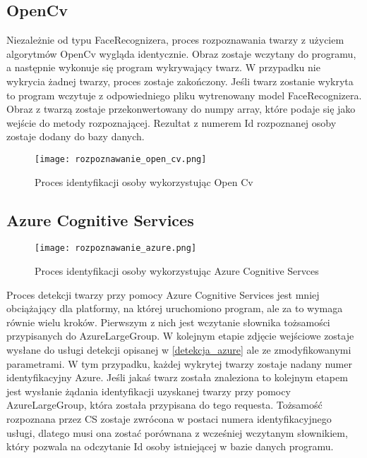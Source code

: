 \subsection{OpenCv}
Niezależnie od typu FaceRecognizera, proces rozpoznawania twarzy z użyciem algorytmów OpenCv wygląda identycznie. Obraz zostaje wczytany do programu, a następnie wykonuje się program wykrywający twarz. W przypadku nie wykrycia żadnej twarzy, proces zostaje zakończony. Jeśli twarz zostanie wykryta to program wczytuje z odpowiedniego pliku wytrenowany model FaceRecognizera. Obraz z twarzą zostaje przekonwertowany do numpy array, które podaje się jako wejście do metody rozpoznającej. Rezultat z numerem Id rozpoznanej osoby zostaje dodany do bazy danych.
\begin{figure}[H]
	\centering
	\texttt{[image: rozpoznawanie\_open\_cv.png]}
	\caption{Proces identyfikacji osoby wykorzystując Open Cv}
	\label{fig:rozpoznawanie_open_cv}
\end{figure}

\subsection{Azure Cognitive Services}
\begin{figure}[H]
	\centering
	\texttt{[image: rozpoznawanie\_azure.png]}
	\caption{Proces identyfikacji osoby wykorzystując Azure Cognitive Servces}
	\label{fig:rozpoznawanie_azure}
\end{figure}
Proces detekcji twarzy przy pomocy Azure Cognitive Services jest mniej obciążający dla platformy, na której uruchomiono program, ale za to wymaga równie wielu kroków. Pierwszym z nich jest wczytanie słownika tożsamości przypisanych do AzureLargeGroup. W kolejnym etapie zdjęcie wejściowe zostaje wysłane do usługi detekcji opisanej w \ref{detekcja_azure} ale ze zmodyfikowanymi parametrami. W tym przypadku, każdej wykrytej twarzy zostaje nadany numer identyfikacyjny Azure. Jeśli jakaś twarz została znaleziona to kolejnym etapem jest wysłanie żądania identyfikacji uzyskanej twarzy przy pomocy AzureLargeGroup, która została przypisana do tego requesta. Tożsamość rozpoznana przez CS zostaje zwrócona w postaci numera identyfikacyjnego usługi, dlatego musi ona zostać porównana z wcześniej wczytanym słownikiem, który pozwala na odczytanie Id osoby istniejącej w bazie danych programu.

